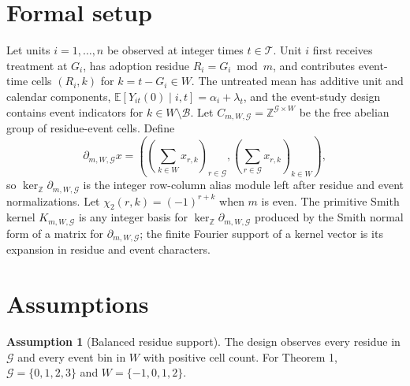 \documentclass[11pt]{article}
\newcommand{\E}{\mathbb{E}}
\theoremstyle{definition}
\newtheorem{assumption}{Assumption}
\theoremstyle{plain}
\theoremstyle{remark}
\begin{document}
\section{Formal setup}
Let units \(i=1,\ldots,n\) be observed at integer times \(t\in\mathcal T\). Unit \(i\) first receives treatment at \(G_i\), has adoption residue \(R_i=G_i\bmod m\), and contributes event-time cells \((R_i,k)\) for \(k=t-G_i\in W\). The untreated mean has additive unit and calendar components, \(\E[Y_{it}(0)\mid i,t]=\alpha_i+\lambda_t\), and the event-study design contains event indicators for \(k\in W\setminus\mathcal B\). Let \(C_{m,W,\mathcal G}=\mathbb Z^{\mathcal G\times W}\) be the free abelian group of residue-event cells. Define
\[
\partial_{m,W,\mathcal G} x=\left(\left(\sum_{k\in W}x_{r,k}\right)_{r\in\mathcal G},\left(\sum_{r\in\mathcal G}x_{r,k}\right)_{k\in W}\right),
\]
so \(\ker_{\mathbb Z}\partial_{m,W,\mathcal G}\) is the integer row-column alias module left after residue and event normalizations. Let \(\chi_2(r,k)=(-1)^{r+k}\) when \(m\) is even. The primitive Smith kernel \(K_{m,W,\mathcal G}\) is any integer basis for \(\ker_{\mathbb Z}\partial_{m,W,\mathcal G}\) produced by the Smith normal form of a matrix for \(\partial_{m,W,\mathcal G}\); the finite Fourier support of a kernel vector is its expansion in residue and event characters.

\begin{center}
\end{center}

\section{Assumptions}
\begin{assumption}[Balanced residue support]\label{ass:balanced}
The design observes every residue in \(\mathcal G\) and every event bin in \(W\) with positive cell count. For Theorem 1, \(\mathcal G=\{0,1,2,3\}\) and \(W=\{-1,0,1,2\}\).
\end{assumption}
\end{document}
